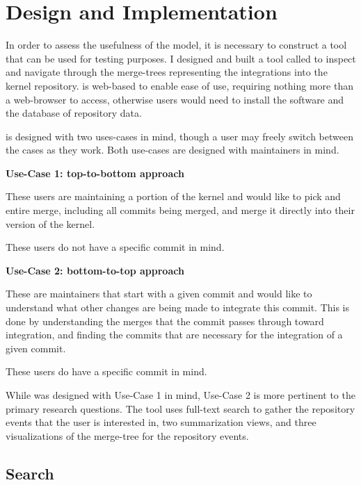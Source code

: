 \chapter{Design and Implementation}\label{cha:design_and_implementation}

In order to assess the usefulness of the model, it is necessary to
construct a tool that can be used for testing purposes. I designed and
built a tool called \tool{} to inspect and navigate through the
merge-trees representing the integrations into the kernel repository.
\tool{} is web-based to enable ease of use, requiring nothing more than
a web-browser to access, otherwise users would need to install the
software and the database of repository data.

\tool{} is designed with two uses-cases in mind, though a user may
freely switch between the cases as they work. Both use-cases are
designed with maintainers in mind.

\begin{textbox}
  \textbf{Use-Case 1: top-to-bottom approach}

  These users are maintaining a portion of the kernel and would like to
  pick and entire merge, including all commits being merged, and merge
  it directly into their version of the kernel.

  These users do not have a specific commit in mind.
\end{textbox}

\begin{textbox}
  \textbf{Use-Case 2: bottom-to-top approach}

  These are maintainers that start with a given commit and would like to
  understand what other changes are being made to integrate this commit.
  This is done by understanding the merges that the commit passes
  through toward integration, and finding the commits that are necessary
  for the integration of a given commit.

  These users do have a specific commit in mind.
\end{textbox}


While \tool{} was designed with Use-Case 1 in mind, Use-Case 2 is more
pertinent to the primary research questions. The tool uses full-text
search to gather the repository events that the user is interested in,
two summarization views, and three visualizations of the merge-tree for
the repository events.

\section{Search}\label{sec:search}

